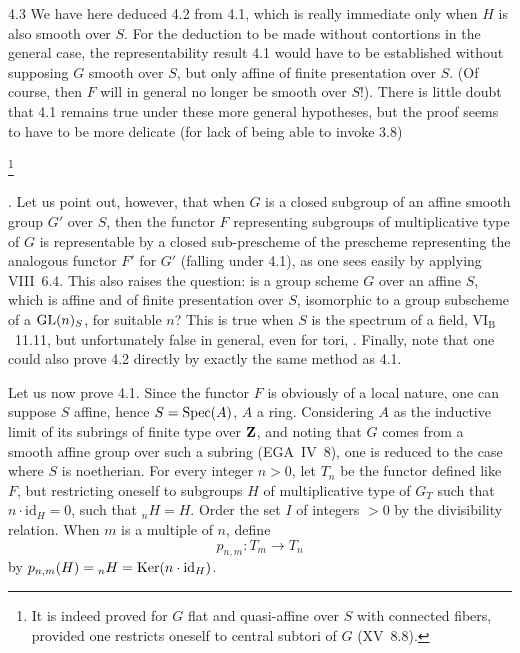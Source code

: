 \begin{remark}{4.3}\label{XI.4.3}
We have here deduced 4.2 from 4.1, which is really immediate only when $H$ is also smooth over $S$. For the deduction to be made without contortions in the general case, the representability result 4.1 would have to be established without supposing $G$ smooth over $S$, but only affine of finite presentation over $S$. (Of course, then $F$ will in general no longer be smooth over $S$!). There is little doubt that 4.1 remains true under these more general hypotheses, but the proof seems to have to be more delicate (for lack of being able to invoke 3.8){\renewcommand{\thefootnote}{*}\footnote{It is indeed proved for $G$ flat and quasi-affine over $S$ with connected fibers, provided one restricts oneself to central subtori of $G$ (XV~8.8).}\addtocounter{footnote}{-1}}. Let us point out, however, that when $G$ is a closed subgroup of an affine smooth group $G'$ over $S$, then the functor $F$ representing subgroups of multiplicative type of $G$ is representable by a closed sub-prescheme of the prescheme representing the analogous functor $F'$ for $G'$ (falling under 4.1), as one sees easily by applying VIII~6.4. This also raises the question: is a group scheme $G$ over an affine $S$, which is affine and of finite presentation over $S$, isomorphic to a group subscheme of a $\operatorname{GL}(n)_S$, for suitable $n$? This is true when $S$ is the spectrum of a field, \cf VI$_{\mathrm B}$~11.11, but unfortunately false in general, even for tori, . Finally, note that one could also prove 4.2 directly by exactly the same method as 4.1.
\end{remark}

Let us now prove 4.1. Since the functor $F$ is obviously of a local nature, one can suppose $S$ affine, hence $S=\operatorname{Spec}(A)$, $A$ a ring. Considering $A$ as the inductive limit of its subrings of finite type over $\mathbf{Z}$, and noting that $G$ comes from a smooth affine group over such a subring (EGA~IV~8), one is reduced to the case where $S$ is noetherian. For every integer $n>0$, let $T_n$ be the functor defined like $F$, but restricting oneself to subgroups $H$ of multiplicative type of $G_T$ such that $n\cdot\mathrm{id}_H=0$, \ie such that ${}_nH=H$. Order the set $I$ of integers $>0$ by the divisibility relation. When $m$ is a multiple of $n$, define
\[
p_{n,m}:T_m\to T_n
\]
by $p_{n,m}(H)={}_nH=\operatorname{Ker}(n\cdot\mathrm{id}_H)$.

